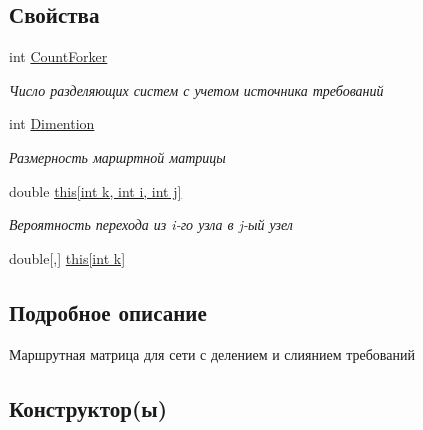 \subsection*{Свойства}
\begin{DoxyCompactItemize}
\item 
int \hyperlink{class_networks_1_1_routing_matrix_ae2bc6f248f493e8b7e2c7a9973c48cb0}{Count\+Forker}
\begin{DoxyCompactList}\small\item\em Число разделяющих систем с учетом источника требований \end{DoxyCompactList}\item 
int \hyperlink{class_networks_1_1_routing_matrix_a01211b1807b7b63b0796c58e11b42aeb}{Dimention}
\begin{DoxyCompactList}\small\item\em Размерность маршртной матрицы \end{DoxyCompactList}\item 
double \hyperlink{class_networks_1_1_routing_matrix_a96fe5877fb4ec7f740fa1a16b65ccb89}{this\mbox{[}int k, int i, int j\mbox{]}}
\begin{DoxyCompactList}\small\item\em Вероятность перехода из i-\/го узла в j-\/ый узел \end{DoxyCompactList}\item 
double\mbox{[},\mbox{]} \hyperlink{class_networks_1_1_routing_matrix_ab17bb40663ec472f48b7b213032e0eba}{this\mbox{[}int k\mbox{]}}
\end{DoxyCompactItemize}


\subsection{Подробное описание}
Маршрутная матрица для сети с делением и слиянием требований 



\subsection{Конструктор(ы)}
